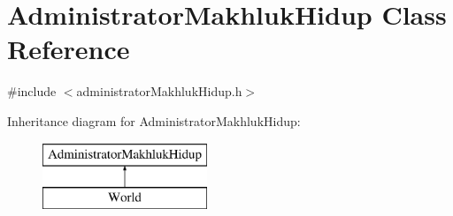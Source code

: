 \hypertarget{class_administrator_makhluk_hidup}{}\section{Administrator\+Makhluk\+Hidup Class Reference}
\label{class_administrator_makhluk_hidup}


{\ttfamily \#include $<$administrator\+Makhluk\+Hidup.\+h$>$}

Inheritance diagram for Administrator\+Makhluk\+Hidup\+:\begin{figure}[H]
\begin{center}
\leavevmode
\includegraphics[height=2.000000cm]{class_administrator_makhluk_hidup}
\end{center}
\end{figure}
